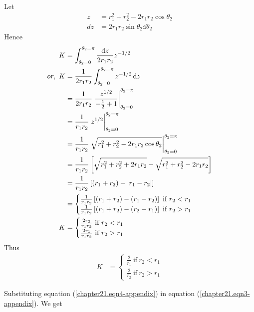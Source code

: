	Let
	\begin{align*}
		z &= r_1^2 + r_2^2 - 2r_1 r_2 \cos\theta_2 \\
		dz &= 2 r_1 r_2 \sin\theta_2 \dd{\theta_2}
	\end{align*}
	Hence 
	\begin{align*}
		K &= \int_{\theta_2=0}^{\theta_2=\pi} \frac{\dd{z}}{2 r_1 r_2} z^{-1/2} \\
		or, \ K &= \frac{1}{2 r_1 r_2}  \int_{\theta_2=0}^{\theta_2=\pi} z^{-1/2} \dd{z} \\
		&= \frac{1}{2 r_1 r_2}  \eval{\frac{z^{1/2}}{-\frac{1}{2} + 1}}_{\theta_2=0}^{\theta_2=\pi}\\
		&= \frac{1}{r_1 r_2} \eval{z^{1/2}}_{\theta_2=0}^{\theta_2=\pi}  \\
		&= \frac{1}{r_1 r_2} \eval{\sqrt{r_1^2 + r_2^2 - 2r_1 r_2 \cos\theta_2}}_{\theta_2=0}^{\theta_2=\pi} \\
		&= \frac{1}{r_1 r_2} \left[\sqrt{r_1^2 + r_2^2 + 2 r_1 r_2}  -  \sqrt{r_1^2 + r_2^2 - 2 r_1 r_2}\right] \\
		&= \frac{1}{r_1 r_2} \left[\qty(r_1 + r_2)  -  \abs{r_1  -  r_2}\right] \\
		&= \begin{cases}
			\frac{1}{r_1 r_2} \left[\qty(r_1 + r_2)  -  \qty(r_1  -  r_2)\right] \ \text{if} \ r_2 < r_1
			\\
			\frac{1}{r_1 r_2} \left[\qty(r_1 + r_2)  -  \qty(r_2  -  r_1)\right] \ \text{if} \ r_2 > r_1
		\end{cases} \\
		K &= \begin{cases}
			\frac{2 r_2}{r_1 r_2} \ \text{if} \ r_2 < r_1\\
			\frac{2 r_1}{r_1 r_2}  \ \text{if} \ r_2 > r_1
		\end{cases}
	\end{align*}
	Thus
	\begin{align}
		\label{chapter21.eqn4-appendix}
		K &= \begin{cases}
		\frac{2}{r_1} \ \text{if} \ r_2 < r_1\\
		\frac{2}{r_2}  \ \text{if} \ r_2 > r_1
		\end{cases}
	\end{align}
	
	Substituting equation (\ref{chapter21.eqn4-appendix}) in equation (\ref{chapter21.eqn3-appendix}). We get
	
